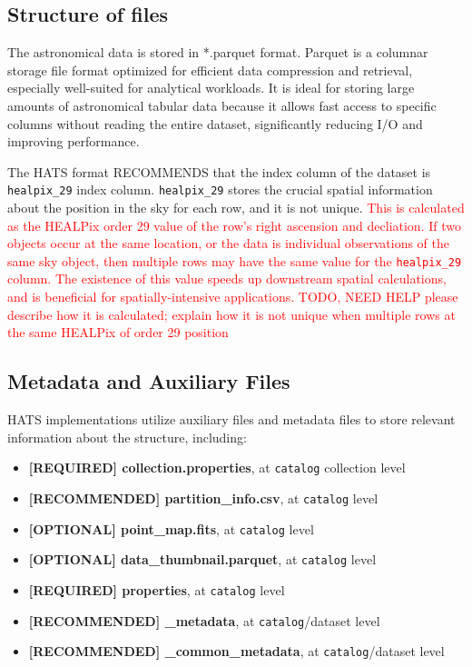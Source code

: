 \documentclass[11pt,a4paper]{ivoa}
\begin{document}
     \subsection{Structure of files} \label{sec:parquet}
The astronomical data is stored in *.parquet format. Parquet is a columnar storage file format optimized for efficient data compression and retrieval, especially well-suited for analytical workloads. It is ideal for storing large amounts of astronomical tabular data because it allows fast access to specific columns without reading the entire dataset, significantly reducing I/O and improving performance. \par
The HATS format RECOMMENDS that the index column of the dataset is \texttt{healpix\_29} index column.  \texttt{healpix\_29} stores the crucial spatial information about the position in the sky for each row, and it is not unique.
\textcolor{red}{This is calculated as the HEALPix order 29 value of the row's right ascension and decliation. If two objects occur at the same location, or the data is individual observations of the same sky object, then multiple rows may have the same value for the \texttt{healpix\_29} column.
The existence of this value speeds up downstream spatial calculations, and is beneficial for spatially-intensive applications.}
\textcolor{red}{TODO, NEED HELP please describe how it is calculated; explain how it is not unique when multiple rows at the same HEALPix of order 29 position} 

    \subsection{Metadata and Auxiliary Files} \label{sec:meta}
    HATS implementations utilize auxiliary files and metadata files to store relevant information about the  structure, including:
    \begin{itemize}
    	\item \textbf{[REQUIRED] collection.properties}, at  \texttt{catalog} collection level
         \item \textbf{[RECOMMENDED] partition\_info.csv}, at  \texttt{catalog} level
        \item \textbf{[OPTIONAL] point\_map.fits}, at  \texttt{catalog} level
        \item \textbf{[OPTIONAL] data\_thumbnail.parquet}, at  \texttt{catalog} level
        \item \textbf{[REQUIRED] properties}, at  \texttt{catalog} level
        \item \textbf{[RECOMMENDED] \_metadata}, at  \texttt{catalog}/dataset level
        \item \textbf{[RECOMMENDED] \_common\_metadata}, at  \texttt{catalog}/dataset level
    \end{itemize}
    
\end{document}
